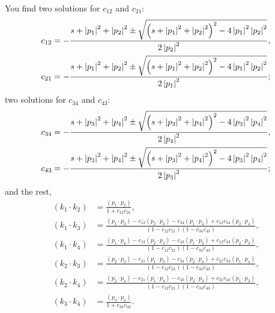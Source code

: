 You find two solutions for $c_{12}$ and $c_{21}$:
\begin{equation}
\begin{split}
	c_{12} &= -\frac{s + \left\lvert p_{1} \right\rvert^{2} + \left\lvert p_{2} \right\rvert^{2} \pm \sqrt{\left( s + \left\lvert p_{1} \right\rvert^{2} + \left\lvert p_{2} \right\rvert^{2} \right)^{2} - 4 \left\lvert p_{1} \right\rvert^{2} \left\lvert p_{2} \right\rvert^{2}}}{2\left\lvert p_{2} \right\rvert^{2}}, \\
	c_{21} &= -\frac{s + \left\lvert p_{1} \right\rvert^{2} + \left\lvert p_{2} \right\rvert^{2} \pm \sqrt{\left( s + \left\lvert p_{1} \right\rvert^{2} + \left\lvert p_{2} \right\rvert^{2} \right)^{2} - 4 \left\lvert p_{1} \right\rvert^{2} \left\lvert p_{2} \right\rvert^{2}}}{2\left\lvert p_{1} \right\rvert^{2}};
\end{split}
\end{equation}
two solutions for $c_{34}$ and $c_{43}$:
\begin{equation}
\begin{split}
	c_{34} &= -\frac{s + \left\lvert p_{3} \right\rvert^{2} + \left\lvert p_{4} \right\rvert^{2} \pm \sqrt{\left( s + \left\lvert p_{3} \right\rvert^{2} + \left\lvert p_{4} \right\rvert^{2} \right)^{2} - 4 \left\lvert p_{3} \right\rvert^{2} \left\lvert p_{4} \right\rvert^{2}}}{2\left\lvert p_{4} \right\rvert^{2}}, \\
	c_{43} &= -\frac{s + \left\lvert p_{3} \right\rvert^{2} + \left\lvert p_{4} \right\rvert^{2} \pm \sqrt{\left( s + \left\lvert p_{3} \right\rvert^{2} + \left\lvert p_{4} \right\rvert^{2} \right)^{2} - 4 \left\lvert p_{3} \right\rvert^{2} \left\lvert p_{4} \right\rvert^{2}}}{2\left\lvert p_{3} \right\rvert^{2}};
\end{split}
\end{equation}
and the rest,
\begin{align}
	\left( k_{1} \cdot k_{2} \right) &= \frac{\left( p_{1} \cdot p_{2} \right)}{1 + c_{12} c_{21}}, \\
	\left( k_{1} \cdot k_{3} \right) &= \frac{ \left( p_{1} \cdot p_{3} \right) - c_{12} \left( p_{2} \cdot p_{3} \right) - c_{34} \left( p_{1} \cdot p_{4} \right) + c_{12} c_{34} \left( p_{2} \cdot p_{4} \right) }{\left( 1 - c_{12} c_{21} \right) \left( 1 - c_{34} c_{43} \right)}, \\
	\left( k_{1} \cdot k_{4} \right) &= \frac{ \left( p_{1} \cdot p_{4} \right) - c_{12} \left( p_{2} \cdot p_{4} \right) - c_{43} \left( p_{1} \cdot p_{3} \right) + c_{12} c_{43} \left( p_{2} \cdot p_{3} \right) }{\left( 1 - c_{12} c_{21} \right) \left( 1 - c_{34} c_{43} \right)}, \\
	\left( k_{2} \cdot k_{3} \right) &= \frac{ \left( p_{2} \cdot p_{3} \right) - c_{21} \left( p_{1} \cdot p_{3} \right) - c_{34} \left( p_{2} \cdot p_{4} \right) + c_{21} c_{34} \left( p_{1} \cdot p_{4} \right) }{\left( 1 - c_{12} c_{21} \right) \left( 1 - c_{34} c_{43} \right)}, \\
	\left( k_{2} \cdot k_{4} \right) &= \frac{ \left( p_{2} \cdot p_{4} \right) - c_{21} \left( p_{1} \cdot p_{4} \right) - c_{43} \left( p_{2} \cdot p_{3} \right) + c_{21} c_{43} \left( p_{1} \cdot p_{3} \right) }{\left( 1 - c_{12} c_{21} \right) \left( 1 - c_{34} c_{43} \right)}, \\
	\left( k_{3} \cdot k_{4} \right) &= \frac{\left( p_{3} \cdot p_{4} \right)}{1 + c_{34} c_{43}}.
\end{align}